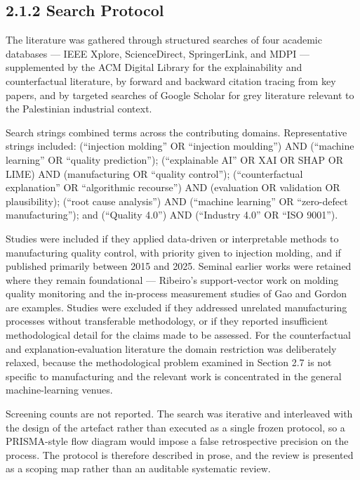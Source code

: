 \hypertarget{search-protocol}{%
\subsection{2.1.2 Search Protocol}\label{search-protocol}}

The literature was gathered through structured searches of four academic databases --- IEEE Xplore, ScienceDirect, SpringerLink, and MDPI --- supplemented by the ACM Digital Library for the explainability and counterfactual literature, by forward and backward citation tracing from key papers, and by targeted searches of Google Scholar for grey literature relevant to the Palestinian industrial context.

Search strings combined terms across the contributing domains. Representative strings included: (``injection molding'' OR ``injection moulding'') AND (``machine learning'' OR ``quality prediction''); (``explainable AI'' OR XAI OR SHAP OR LIME) AND (manufacturing OR ``quality control''); (``counterfactual explanation'' OR ``algorithmic recourse'') AND (evaluation OR validation OR plausibility); (``root cause analysis'') AND (``machine learning'' OR ``zero-defect manufacturing''); and (``Quality 4.0'') AND (``Industry 4.0'' OR ``ISO 9001'').

Studies were included if they applied data-driven or interpretable methods to manufacturing quality control, with priority given to injection molding, and if published primarily between 2015 and 2025. Seminal earlier works were retained where they remain foundational --- Ribeiro's support-vector work on molding quality monitoring and the in-process measurement studies of Gao and Gordon are examples. Studies were excluded if they addressed unrelated manufacturing processes without transferable methodology, or if they reported insufficient methodological detail for the claims made to be assessed. For the counterfactual and explanation-evaluation literature the domain restriction was deliberately relaxed, because the methodological problem examined in Section 2.7 is not specific to manufacturing and the relevant work is concentrated in the general machine-learning venues.

Screening counts are not reported. The search was iterative and interleaved with the design of the artefact rather than executed as a single frozen protocol, so a PRISMA-style flow diagram would impose a false retrospective precision on the process. The protocol is therefore described in prose, and the review is presented as a scoping map rather than an auditable systematic review.

